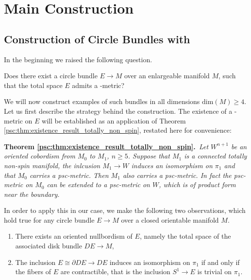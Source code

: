 \chapter{Main Construction}
\label{sec:constr}

\section{Construction of Circle Bundles with \psc}

In the beginning we raised the following question.

\begin{question}
	\label{constr:question_A}
	Does there exist a circle bundle $E \to M$ over an enlargeable manifold $M$, such that the total space $E$ admits a \psc-metric?
\end{question}

We will now construct examples of such bundles in all dimensions $\mathrm{dim}(M) \geq 4$. Let us first describe the strategy behind the construction. The existence of a \psc-metric on $E$ will be established as an application of Theorem \ref{psc:thm:existence_result_totally_non_spin}, restated here for convenience:

\vspace{\baselineskip}
\noindent\textbf{Theorem \ref{psc:thm:existence_result_totally_non_spin}.}\itshape\ 
Let $W^{n+1}$ be an oriented cobordism from $M_0$ to $M_1$, $n \geq 5$. Suppose that $M_1$ is a connected totally non-spin manifold, the inlcusion $M_1 \to W$ induces an isomorphism on $\pi_1$ and that $M_0$ carries a psc-metric. Then $M_1$ also carries a psc-metric. In fact the psc-metric on $M_0$ can be extended to a psc-metric on $W$, which is of product form near the boundary. 
\normalfont
\vspace{\baselineskip}

In order to apply this in our case, we make the following two observations, which hold true for any circle bundle $E \to M$ over a closed orientable manifold $M$. 

\begin{enumerate}[label=(\roman*)]
	\item There exists an oriented nullbordism of $E$, namely the total space of the associated disk bundle $DE \to M$,
	\item \label{constr:eq:circle_bundle_observation2} The inclusion $E \cong \partial DE \to DE$ induces an isomorphism on $\pi_1$ if and only if the fibers of $E$ are contractible, that is the inclusion $S^1 \to E$ is trivial on $\pi_1$.
\end{enumerate}

